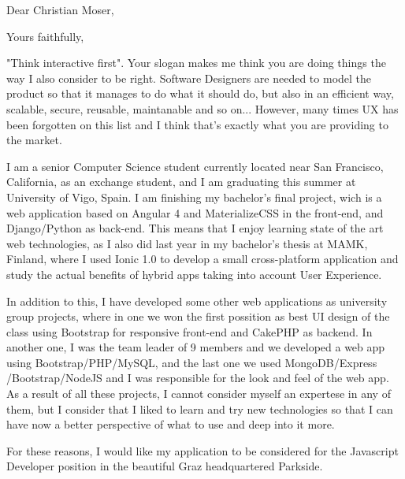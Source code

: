 \documentclass[11pt,a4paper,sans]{moderncv}
\begin{document}
\date{07 May 2016}
\opening{Dear Christian Moser,}
\closing{Yours faithfully,}
\makelettertitle

"Think interactive first". Your slogan makes me think you are doing things the way I also consider to be right. Software Designers are needed to model the product so that it manages to do what it should do, but also in an efficient way, scalable, secure, reusable, maintanable and so on... However, many times UX has been forgotten on this list and I think that's exactly what you are providing to the market.

I am a senior Computer Science student currently located near San Francisco, California, as an exchange student, and I am graduating this summer at University of Vigo, Spain. I am finishing my bachelor's final project, wich is a web application based on Angular 4 and MaterializeCSS in the front-end, and Django/Python as back-end. This means that I enjoy learning state of the art web technologies, as I also did last year in my bachelor's thesis at MAMK, Finland, where I used Ionic 1.0 to develop a small cross-platform application and study the actual benefits of hybrid apps taking into account User Experience.

In addition to this, I have developed some other web applications as university group projects, where in one we won the first possition as best UI design of the class using Bootstrap for responsive front-end and CakePHP as backend. In another one, I was the team leader of 9 members and we developed a web app using Bootstrap/PHP/MySQL, and the last one we used MongoDB/Express /Bootstrap/NodeJS and I was responsible for the look and feel of the web app. As a result of all these projects, I cannot consider myself an expertese in any of them, but I consider that I liked to learn and try new technologies so that I can have now a better perspective of what to use and deep into it more.


For these reasons, I would like my application to be considered for the Javascript Developer position in the beautiful Graz headquartered Parkside.

\makeletterclosing
\end{document}
